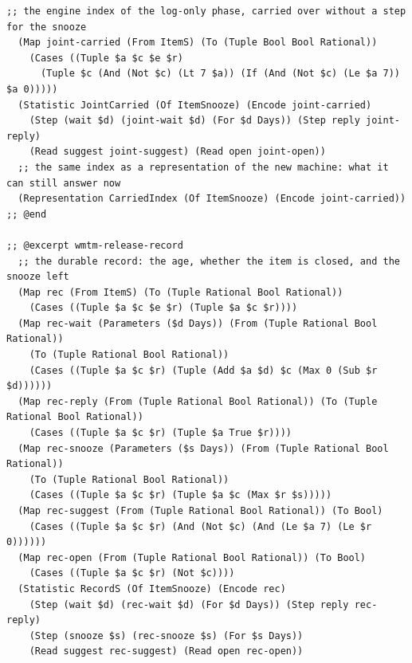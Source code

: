 \documentclass[11pt]{article}
\theoremstyle{definition}
\theoremstyle{plain}
\begin{document}
\begin{lstlisting}[style=mettafull]
  ;; the engine index of the log-only phase, carried over without a step for the snooze
  (Map joint-carried (From ItemS) (To (Tuple Bool Bool Rational))
    (Cases ((Tuple $a $c $e $r)
      (Tuple $c (And (Not $c) (Lt 7 $a)) (If (And (Not $c) (Le $a 7)) $a 0)))))
  (Statistic JointCarried (Of ItemSnooze) (Encode joint-carried)
    (Step (wait $d) (joint-wait $d) (For $d Days)) (Step reply joint-reply)
    (Read suggest joint-suggest) (Read open joint-open))
  ;; the same index as a representation of the new machine: what it can still answer now
  (Representation CarriedIndex (Of ItemSnooze) (Encode joint-carried))
;; @end

;; @excerpt wmtm-release-record
  ;; the durable record: the age, whether the item is closed, and the snooze left
  (Map rec (From ItemS) (To (Tuple Rational Bool Rational))
    (Cases ((Tuple $a $c $e $r) (Tuple $a $c $r))))
  (Map rec-wait (Parameters ($d Days)) (From (Tuple Rational Bool Rational))
    (To (Tuple Rational Bool Rational))
    (Cases ((Tuple $a $c $r) (Tuple (Add $a $d) $c (Max 0 (Sub $r $d))))))
  (Map rec-reply (From (Tuple Rational Bool Rational)) (To (Tuple Rational Bool Rational))
    (Cases ((Tuple $a $c $r) (Tuple $a True $r))))
  (Map rec-snooze (Parameters ($s Days)) (From (Tuple Rational Bool Rational))
    (To (Tuple Rational Bool Rational))
    (Cases ((Tuple $a $c $r) (Tuple $a $c (Max $r $s)))))
  (Map rec-suggest (From (Tuple Rational Bool Rational)) (To Bool)
    (Cases ((Tuple $a $c $r) (And (Not $c) (And (Le $a 7) (Le $r 0))))))
  (Map rec-open (From (Tuple Rational Bool Rational)) (To Bool)
    (Cases ((Tuple $a $c $r) (Not $c))))
  (Statistic RecordS (Of ItemSnooze) (Encode rec)
    (Step (wait $d) (rec-wait $d) (For $d Days)) (Step reply rec-reply)
    (Step (snooze $s) (rec-snooze $s) (For $s Days))
    (Read suggest rec-suggest) (Read open rec-open))


\end{lstlisting}
\end{document}
